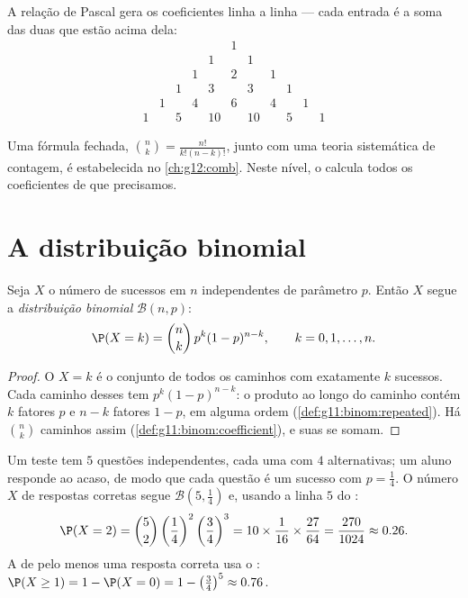 A relação de Pascal gera os coeficientes linha a linha --- cada entrada é
a soma das duas que estão acima dela:
\[
\begin{array}{ccccccccccc}
&&&&&1&&&&&\\
&&&&1&&1&&&&\\
&&&1&&2&&1&&&\\
&&1&&3&&3&&1&&\\
&1&&4&&6&&4&&1&\\
1&&5&&10&&10&&5&&1
\end{array}
\]

\begin{remark}
Uma fórmula fechada, $\binom nk = \frac{n!}{k!(n-k)!}$, junto com uma
teoria sistemática de contagem, é estabelecida no \cref{ch:g12:comb}.
Neste nível, o  calcula todos os coeficientes de que
precisamos.
\end{remark}

\section{A distribuição binomial}

\begin{theorem}\label{thm:g11:binom:binomial}
Seja $X$ o número de sucessos em $n$  independentes
de parâmetro $p$. Então $X$ segue a \emph{distribuição
binomial} $\mathcal B(n, p)$:
\[
\P(X = k) = \binom{n}{k}\, p^k (1-p)^{n-k},
\qquad k = 0, 1, \dots, n .
\]
\end{theorem}

\begin{proof}
O  $X = k$ é o conjunto de todos os caminhos com exatamente $k$
sucessos. Cada caminho desses tem  $p^k(1-p)^{n-k}$: o
produto ao longo do caminho contém $k$ fatores $p$ e $n - k$ fatores
$1-p$, em alguma ordem (\cref{def:g11:binom:repeated}). Há $\binom nk$
caminhos assim (\cref{def:g11:binom:coefficient}), e suas 
se somam.
\end{proof}

\begin{example}\label{ex:g11:binom:quiz}
Um teste tem $5$ questões independentes, cada uma com $4$ alternativas;
um aluno responde ao acaso, de modo que cada questão é um sucesso com
$p = \frac14$. O número $X$ de respostas corretas segue
$\mathcal B\left(5, \frac14\right)$ e, usando a linha $5$ do :
\[
\P(X = 2) = \binom52 \left(\frac14\right)^2\left(\frac34\right)^3
= 10 \times \frac{1}{16} \times \frac{27}{64}
= \frac{270}{1024} \approx 0.26 .
\]
A  de pelo menos uma resposta correta usa o :
$\P(X \geq 1) = 1 - \P(X = 0) = 1 - \left(\frac34\right)^5 \approx
0.76$.
\end{example}

